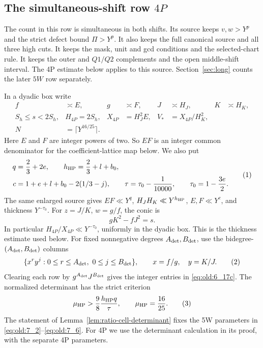\subsection{The simultaneous-shift row $4P$}

The count in this row is simultaneous in both shifts.  Its source keeps
$v,w>Y^p$ and the strict defect bound $\Pi>Y^p$.  It also keeps the full
canonical source and all three high cuts.  It keeps the mask, unit and gcd
conditions and the selected-chart rule.  It keeps the outer and \(Q1/Q2\)
complements and the open middle-shift interval.  The 4P estimate below applies to this source.
Section~\ref{sec:long} counts the later $5W$ row separately.

In a dyadic box write
\[
 \begin{aligned}
 f&\asymp E,&g&\asymp F,&J&\asymp H_J,&K&\asymp H_K,\\
 S_h\le s<2S_h,&H_{4P}=2S_h,&X_{4P}&=H_J^2E,&V_*&=X_{4P}/H_K^2,\\
 N&=\lceil Y^{16/25}\rceil.
 \end{aligned}
\]
Here \(E\) and \(F\) are integer powers of two.  So \(EF\) is an integer
common denominator for the coefficient-lattice map below.  We also put
\[
 \begin{aligned}
 q&=\frac{2}{3}+2e,\qquad h_{\rm HP}=\frac{2}{3}+l+b_0,\\
 c&=1+e+l+b_0-2(1/3-j),\qquad
 \tau=\tau_0-\frac{1}{10000},\qquad \tau_0=1-\frac{3e}{2}.
 \end{aligned}                                          \AutoTag{eq:old:6_15}
\]
The same enlarged source gives $EF\ll Y^q$, $H_JH_K\ll Y^{h_{\rm HP}}$,
$E,F\ll Y^c$, and thickness $Y^{-\tau_0}$.  For
$z=J/K$, $w=g/f$, the conic is
\[
 gK^2-fJ^2=s.
\]
In particular \(H_{4P}/X_{4P}\ll Y^{-\tau_0}\), uniformly in the dyadic
box.  This is the thickness estimate used below.
For fixed nonnegative degrees \(A_{\rm det},B_{\rm det}\), use the
bidegree-\((A_{\rm det},B_{\rm det})\) columns
\[
 \{x^r y^j:0\le r\le A_{\rm det},\ 0\le j\le B_{\rm det}\},\qquad
 x=f/g,\quad y=K/J.                                      \AutoTag{eq:old:6_16}
\]
Clearing each row by \(g^{A_{\rm det}}J^{B_{\rm det}}\) gives the
integer entries in \eqref{eq:old:6_17c}.
The normalized determinant has the strict criterion
\[
\mu_{\rm HP}>\frac{9}{8}\frac{h_{\rm HP}q}{\tau},\qquad
\mu_{\rm HP}=\frac{16}{25}.
\AutoTag{eq:old:6_17}
\]
The statement of Lemma~\ref{lem:ratio-cell-determinant} fixes the 5W
parameters in \eqref{eq:old:7_2}--\eqref{eq:old:7_6}.  For 4P we use the
determinant calculation in its proof, with the separate 4P parameters.
